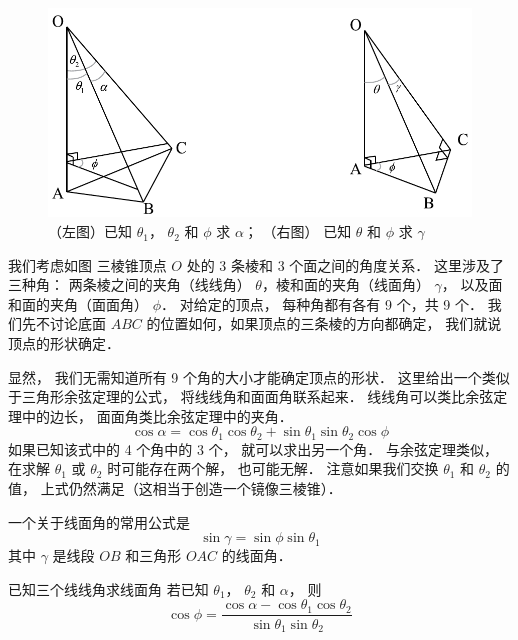 

\begin{figure}[ht]
\centering
\includegraphics[width=12cm]{./figures/PrmSol1.pdf}
\caption{（左图）已知 $\theta_1$， $\theta_2$ 和 $\phi$ 求 $\alpha$； （右图） 已知 $\theta$ 和 $\phi$ 求 $\gamma$} \label{PrmSol_fig1}
\end{figure}

我们考虑如图%
三棱锥顶点 $O$ 处的 3 条棱和 3 个面之间的角度关系． 这里涉及了三种角： 两条棱之间的夹角（线线角） $\theta$，棱和面的夹角（线面角） $\gamma$， 以及面和面的夹角（面面角） $\phi$． 对给定的顶点， 每种角都有各有 9 个，共 9 个． 我们先不讨论底面 $ABC$ 的位置如何，如果顶点的三条棱的方向都确定， 我们就说顶点的形状确定．

显然， 我们无需知道所有 9 个角的大小才能确定顶点的形状． 这里给出一个类似于三角形余弦定理的公式， 将线线角和面面角联系起来． 线线角可以类比余弦定理中的边长， 面面角类比余弦定理中的夹角．
\begin{equation}\label{PrmSol_eq1}
\cos\alpha = \cos\theta_1 \cos\theta_2 + \sin\theta_1 \sin\theta_2 \cos\phi
\end{equation}
如果已知该式中的 4 个角中的 3 个， 就可以求出另一个角． 与余弦定理类似， 在求解 $\theta_1$ 或 $\theta_2$ 时可能存在两个解， 也可能无解． 注意如果我们交换 $\theta_1$ 和 $\theta_2$ 的值， 上式仍然满足（这相当于创造一个镜像三棱锥）．

一个关于线面角的常用公式是
\begin{equation}\label{PrmSol_eq2}
\sin\gamma = \sin\phi\sin\theta_1
\end{equation}
其中 $\gamma$ 是线段 $OB$ 和三角形 $OAC$ 的线面角．

\begin{exam}{已知三个线线角求线面角}
若已知 $\theta_1$， $\theta_2$ 和 $\alpha$， 则
\begin{equation}
\cos\phi = \frac{\cos\alpha - \cos\theta_1 \cos\theta_2}{\sin\theta_1 \sin\theta_2}
\end{equation}
\end{exam}

